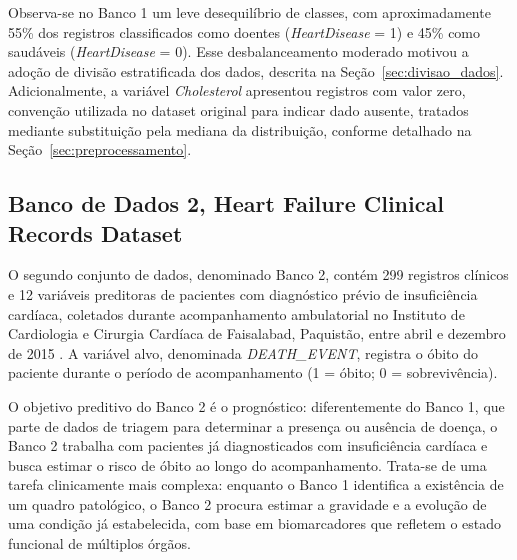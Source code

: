 Observa-se no Banco 1 um leve desequilíbrio de classes, com aproximadamente 55\% dos registros classificados como doentes (\textit{HeartDisease} = 1) e 45\% como saudáveis (\textit{HeartDisease} = 0). Esse desbalanceamento moderado motivou a adoção de divisão estratificada dos dados, descrita na Seção~\ref{sec:divisao_dados}. Adicionalmente, a variável \textit{Cholesterol} apresentou registros com valor zero, convenção utilizada no dataset original para indicar dado ausente, tratados mediante substituição pela mediana da distribuição, conforme detalhado na Seção~\ref{sec:preprocessamento}.

\subsection{Banco de Dados 2, Heart Failure Clinical Records Dataset}

O segundo conjunto de dados, denominado Banco 2, contém 299 registros clínicos e 12 variáveis preditoras de pacientes com diagnóstico prévio de insuficiência cardíaca, coletados durante acompanhamento ambulatorial no Instituto de Cardiologia e Cirurgia Cardíaca de Faisalabad, Paquistão, entre abril e dezembro de 2015 \cite{chicco2020}. A variável alvo, denominada \textit{DEATH\_EVENT}, registra o óbito do paciente durante o período de acompanhamento (1 = óbito; 0 = sobrevivência).

O objetivo preditivo do Banco 2 é o prognóstico: diferentemente do Banco 1, que parte de dados de triagem para determinar a presença ou ausência de doença, o Banco 2 trabalha com pacientes já diagnosticados com insuficiência cardíaca e busca estimar o risco de óbito ao longo do acompanhamento. Trata-se de uma tarefa clinicamente mais complexa: enquanto o Banco 1 identifica a existência de um quadro patológico, o Banco 2 procura estimar a gravidade e a evolução de uma condição já estabelecida, com base em biomarcadores que refletem o estado funcional de múltiplos órgãos.

